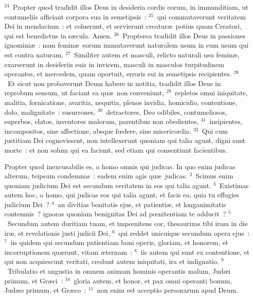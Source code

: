 ${}^{24}$~Propter quod tradidit illos Deus in desideria cordis eorum, in immunditiam, ut contumeliis afficiant corpora sua in semetipsis~:
${}^{25}$~qui commutaverunt veritatem Dei in mendacium~: et coluerunt, et servierunt creatur\ae\ potius quam Creatori, qui est benedictus in s\ae cula. Amen.
${}^{26}$~Propterea tradidit illos Deus in passiones ignomini\ae~: nam femin\ae\ eorum immutaverunt naturalem usum in eum usum qui est contra naturam.
${}^{27}$~Similiter autem et masculi, relicto naturali usu femin\ae , exarserunt in desideriis suis in invicem, masculi in masculos turpitudinem operantes, et mercedem, quam oportuit, erroris sui in semetipsis recipientes.
${}^{28}$~Et sicut non probaverunt Deum habere in notitia, tradidit illos Deus in reprobum sensum, ut faciant ea qu\ae\ non conveniunt,
${}^{29}$~repletos omni iniquitate, malitia, fornicatione, avaritia, nequitia, plenos invidia, homicidio, contentione, dolo, malignitate~: susurrones,
${}^{30}$~detractores, Deo odibiles, contumeliosos, superbos, elatos, inventores malorum, parentibus non obedientes,
${}^{31}$~insipientes, incompositos, sine affectione, absque fœdere, sine misericordia.
${}^{32}$~Qui cum justitiam Dei cognovissent, non intellexerunt quoniam qui talia agunt, digni sunt morte~: et non solum qui ea faciunt, sed etiam qui consentiunt facientibus.

\lettrine[lines=3,image=true,loversize=0.05,lraise=-0.03]{P}{}ropter quod inexcusabilis es, o homo omnis qui judicas. In quo enim judicas alterum, teipsum condemnas~: eadem enim agis qu\ae\ judicas.
${}^{2}$~Scimus enim quoniam judicium Dei est secundum veritatem in eos qui talia agunt.
${}^{3}$~Existimas autem hoc, o homo, qui judicas eos qui talia agunt, et facis ea, quia tu effugies judicium Dei~?
${}^{4}$~an divitias bonitatis ejus, et patienti\ae , et longanimitatis contemnis~? ignoras quoniam benignitas Dei ad pœnitentiam te adducit~?
${}^{5}$~Secundum autem duritiam tuam, et impœnitens cor, thesaurizas tibi iram in die ir\ae , et revelationis justi judicii Dei,
${}^{6}$~qui reddet unicuique secundum opera ejus~:
${}^{7}$~iis quidem qui secundum patientiam boni operis, gloriam, et honorem, et incorruptionem qu\ae runt, vitam \ae ternam~:
${}^{8}$~iis autem qui sunt ex contentione, et qui non acquiescunt veritati, credunt autem iniquitati, ira et indignatio.
${}^{9}$~Tribulatio et angustia in omnem animam hominis operantis malum, Jud\ae i primum, et Gr\ae ci~:
${}^{10}$~gloria autem, et honor, et pax omni operanti bonum, Jud\ae o primum, et Gr\ae co~:
${}^{11}$~non enim est acceptio personarum apud Deum.


